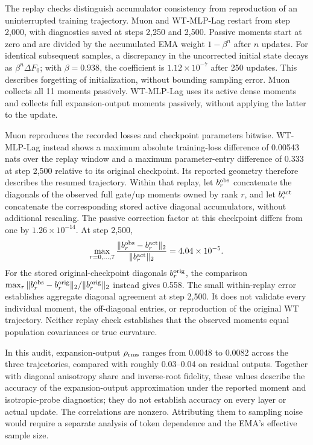The replay checks distinguish accumulator consistency from reproduction of an uninterrupted training trajectory. Muon and WT-MLP-Lag restart from step 2,000, with diagnostics saved at steps 2,250 and 2,500. Passive moments start at zero and are divided by the accumulated EMA weight $1-\beta^n$ after $n$ updates. For identical subsequent samples, a discrepancy in the uncorrected initial state decays as $\beta^n\Delta F_0$; with $\beta=0.938$, the coefficient is $1.12\times10^{-7}$ after 250 updates. This describes forgetting of initialization, without bounding sampling error. Muon collects all 11 moments passively. WT-MLP-Lag uses its active dense moments and collects full expansion-output moments passively, without applying the latter to the update.

Muon reproduces the recorded losses and checkpoint parameters bitwise. WT-MLP-Lag instead shows a maximum absolute training-loss difference of 0.00543 nats over the replay window and a maximum parameter-entry difference of 0.333 at step 2,500 relative to its original checkpoint. Its reported geometry therefore describes the resumed trajectory. Within that replay, let $b_r^{\rm obs}$ concatenate the diagonals of the observed full gate/up moments owned by rank $r$, and let $b_r^{\rm act}$ concatenate the corresponding stored active diagonal accumulators, without additional rescaling. The passive correction factor at this checkpoint differs from one by $1.26\times10^{-14}$. At step 2,500,
\[
 \max_{r=0,\ldots,7}
 \frac{\|b_r^{\rm obs}-b_r^{\rm act}\|_2}{\|b_r^{\rm act}\|_2}
 =4.04\times10^{-5}.
\]
For the stored original-checkpoint diagonals $b_r^{\rm orig}$, the comparison $\max_r\|b_r^{\rm obs}-b_r^{\rm orig}\|_2/\|b_r^{\rm orig}\|_2$ instead gives 0.558. The small within-replay error establishes aggregate diagonal agreement at step 2,500. It does not validate every individual moment, the off-diagonal entries, or reproduction of the original WT trajectory. Neither replay check establishes that the observed moments equal population covariances or true curvature.



In this audit, expansion-output $\rho_{\rm rms}$ ranges from 0.0048 to 0.0082 across the three trajectories, compared with roughly 0.03--0.04 on residual outputs. Together with diagonal anisotropy share and inverse-root fidelity, these values describe the accuracy of the expansion-output approximation under the reported moment and isotropic-probe diagnostics; they do not establish accuracy on every layer or actual update. The correlations are nonzero. Attributing them to sampling noise would require a separate analysis of token dependence and the EMA's effective sample size.

